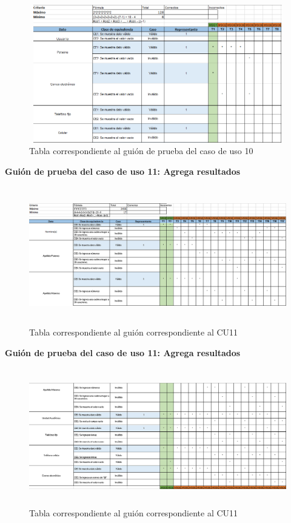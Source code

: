 	\begin{figure}[hbt!]
		\centering
		\includegraphics[width=14cm, height=6cm]{Imagenes/Pruebas/GuionPruebaCU10}
		\caption{Tabla correspondiente al guión de prueba del caso de uso 10}
		\label{guionpruebaCU10}
	\end{figure}

	\textbf{Guión de prueba del caso de uso 11: Agrega resultados}

	\begin{figure}[hbt!]
		\centering
		\includegraphics[width=14cm, height=6cm]{Imagenes/Pruebas/GuionPruebaCU11}
		\caption{Tabla correspondiente al guión correspondiente al CU11}
		\label{guionpruebaCU11}
	\end{figure}
\pagebreak

	\textbf{Guión de prueba del caso de uso 11: Agrega resultados}
	\begin{figure}[hbt!]
		\centering
		\includegraphics[width=14cm, height=6cm]{Imagenes/Pruebas/GuionPruebaCU11_1}
		\caption{Tabla correspondiente al guión correspondiente al CU11}
		\label{guionpruebaCU11_1}
	\end{figure}

